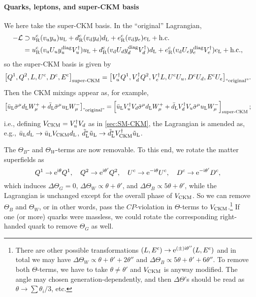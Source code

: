 \documentclass[CheatSheet]{subfiles}
\begin{document}
\paragraph{Quarks, leptons, and super-CKM basis}
We here take the super-CKM basis.
In the ``original'' Lagrangian,
\begin{align}
 -\mathcal L&\supset
   u_{\mathrm{R}}^{\mathrm{c}} (v_{\mathrm{u}} y_{u})u_{\mathrm{L}}
  +d_{\mathrm{R}}^{\mathrm{c}} (v_{\mathrm{d}} y_{d})d_{\mathrm{L}}
  +e_{\mathrm{R}}^{\mathrm{c}} (v_{\mathrm{d}} y_{e})e_{\mathrm{L}} + \text{h.c.}
 \\
&=
   u_{\mathrm{R}}^{\mathrm{c}} (v_{\mathrm{u}} U_u y_{u}^{\mathrm{diag}} V_u^\dagger)u_{\mathrm{L}}
  +d_{\mathrm{R}}^{\mathrm{c}} (v_{\mathrm{d}} U_d y_{d}^{\mathrm{diag}} V_d^\dagger)d_{\mathrm{L}}
  +e_{\mathrm{R}}^{\mathrm{c}} (v_{\mathrm{d}} U_e y_{e}^{\mathrm{diag}} V_e^\dagger)e_{\mathrm{L}} + \text{h.c.},
\end{align}
so the super-CKM basis is given by
\begin{equation}
 \bigl[
 Q^1, Q^2, L, U^{\mathrm{c}}, D^{\mathrm{c}}, E^{\mathrm{c}}
\bigr]_{\text{super-CKM}} =
 \bigl[
 V_u^\dagger Q^1, V_d^\dagger Q^2, V_e^\dagger L, U^{\mathrm{c}} U_u, D^{\mathrm{c}} U_d, E^{\mathrm{c}} U_e
\bigr]_{\text{``original''}}.
\end{equation}
Then the CKM mixings appear as, for example,
\begin{equation}
 \left[\bar u_{\mathrm{L}}\bar\sigma^\mu d_{\mathrm{L}} W^+_\mu + \bar d_{\mathrm{L}}\bar\sigma^\mu u_{\mathrm{L}} W^-_\mu\right]_{\text{''original''}}
=
 \left[\bar u_{\mathrm{L}} V_u^\dagger V_d \bar\sigma^\mu d_{\mathrm{L}} W^+_\mu + \bar d_{\mathrm{L}} V_d^\dagger V_u\bar\sigma^\mu u_{\mathrm{L}} W^-_\mu\right]_{\text{super-CKM}};
\end{equation}
i.e., defining $V_{\mathrm{CKM}} = V_u^\dagger V_d$ as in \cref{sec:SM-CKM},
the Lagrangian is amended as, e.g., $\bar u_{\mathrm{L}}d_{\mathrm{L}}\to \bar u_{\mathrm{L}} V_{\mathrm{CKM}}d_{\mathrm{L}}$, $\tilde d_{\mathrm{L}}^*\tilde u_{\mathrm{L}}\to \tilde d_{\mathrm{L}}^* V^\dagger_{\mathrm{CKM}}\tilde u_{\mathrm{L}}$.

The $\Theta_B$- and $\Theta_W$-terms are now removable.
To this end, we rotate the matter superfields as
\begin{equation}
 Q^1\to\mathop{}\!\mathrm{e}^{\mathrm{i}\theta}Q^1,\quad
 Q^2\to\mathop{}\!\mathrm{e}^{\mathrm{i}\theta'}Q^2,\quad
 U^{\mathrm{c}}\to\mathop{}\!\mathrm{e}^{-\mathrm{i}\theta}U^{\mathrm{c}},\quad
 D^{\mathrm{c}}\to\mathop{}\!\mathrm{e}^{-\mathrm{i}\theta'}D^{\mathrm{c}},
\end{equation}
which induces
$\Delta \Theta_G=0$,
$\Delta \Theta_W\propto \theta+\theta'$,
and
$\Delta \Theta_B\propto 5\theta+\theta'$, while the Lagrangian is unchanged except for the overall phase of $V_{\mathrm{CKM}}$.
So we can remove $\Theta_B$ and $\Theta_W$, or in other words, pass the $CP$-violation in $\Theta$-terms to $V_{\mathrm{CKM}}$.\footnote{%
There are other possible transformations $(L,E^{\mathrm{c}})\to \mathop{}\!\mathrm{e}^{(\pm)\mathrm{i}\theta''}(L,E^{\mathrm{c}})$ and in total we may have $\Delta\Theta_W \propto \theta+\theta'+2\theta''$ and
 $\Delta\Theta_B \propto 5\theta+\theta'+6\theta''$.
 To remove both $\Theta$-terms, we have to take $\theta\neq\theta'$ and $V_{\mathrm{CKM}}$ is anyway modified. The angle may chosen generation-dependently, and then $\Delta\Theta$'s should be read as $\theta\to\sum\theta_i/3$, etc.}
If one (or more) quarks were massless, we could rotate the corresponding right-handed quark to remove $\Theta_G$ as well.
\end{document}
